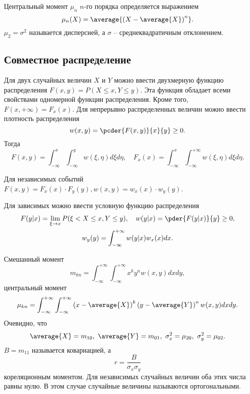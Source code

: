 Центральный момент \( \mu_n \) \( n \)-го порядка определяется выражением
\[
    \mu_n(X) = \average{\left(X - \average{X}\right)^n}.
\]
\( \mu_2 = \sigma^2 \) называется дисперсией, а \( \sigma \) --
среднеквадратичным отклонением.

\subsection{Совместное распределение}
Для двух случайных величин \( X \) и \( Y \) можно ввести двухмерную функцию
распределения \( F(x,y) = P(X \le x, Y \le y) \). Эта функция обладает всеми
свойствами одномерной функции распределения. Кроме того,
\( F(x, +\infty) = F_x(x) \). Для непрерывно распределенных величин можно ввести
плотность распределения
\[
    w(x,y) = \pcder{F(x,y)}{x}{y} \ge 0.
\]
Тогда
\[
    F(x, y) = \int_{-\infty}^x\int_{-\infty}^y w(\xi,\eta)d\xi d\eta,\quad
    F_x(x) = \int_{-\infty}^x\int_{-\infty}^{+\infty} w(\xi,\eta)d\xi d\eta.
\]

Для независимых событий
\( F(x,y) = F_x(x) \cdot F_y(y), w(x,y) = w_x(x) \cdot w_y(y) \).

Для зависимых можно ввести условную функцию распределения
\begin{gather*}
    F(y|x) = \lim_{\xi \to x} P(\xi < X \le x, Y \le y),\quad
    w(y|x) = \pder{F(y|x)}{y} \ge 0,\\
    w_y(y) = \int_{-\infty}^{+\infty} w(y|x) w_x(x) dx.
\end{gather*}

Смешанный момент
\[
    m_{kn} = \int_{-\infty}^{+\infty}\int_{-\infty}^{+\infty}x^ky^nw(x,y)dxdy,
\]
центральный момент
\[
    \mu_{kn} = \int_{-\infty}^{+\infty}\int_{-\infty}^{+\infty}
        \left(x-\average{X}\right)^k
        \left(y-\average{Y}\right)^n w(x,y)dxdy.
\]
Очевидно, что
\[
    \average{X} = m_{10},\ \average{Y} = m_{01},\ \sigma_x^2 = \mu_{20},
    \ \sigma_y^2 = \mu_{02}.
\]
\( B = m_{11} \) называется ковариацией, а
\[
    r = \frac{B}{\sigma_x\sigma_y}
\]
кореляционным моментом. Для независимых случайных величин оба этих числа равны
нулю. В этом случае случайные величины называются ортогональными.
